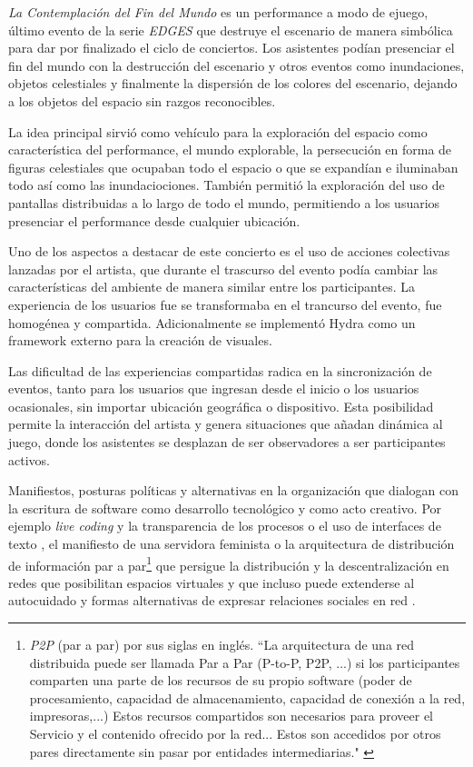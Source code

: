 \textit{La Contemplación del Fin del Mundo} es un performance a modo de ejuego, último evento de la serie \textit{EDGES} que destruye el escenario de manera simbólica para dar por finalizado el ciclo de conciertos. Los asistentes podían presenciar el fin del mundo con la destrucción del escenario y otros eventos como inundaciones, objetos celestiales y finalmente la dispersión de los colores del escenario, dejando a los objetos del espacio sin razgos reconocibles.

La idea principal sirvió como vehículo para la exploración del espacio como característica del performance, el mundo explorable, la persecución en forma de figuras celestiales que ocupaban todo el espacio o que se expandían e iluminaban todo así como las inundaciociones. También permitió la exploración del uso de pantallas distribuidas a lo largo de todo el mundo, permitiendo a los usuarios presenciar el performance desde cualquier ubicación.

Uno de los aspectos a destacar de este concierto es el uso de acciones colectivas lanzadas por el artista, que durante el trascurso del evento podía cambiar las características del ambiente de manera similar entre los participantes. La experiencia de los usuarios fue se transformaba en el trancurso del evento, fue homogénea y compartida. Adicionalmente se implementó Hydra \citep{hydra} como un framework externo para la creación de visuales.

Las dificultad de las experiencias compartidas radica en la sincronización de eventos, tanto para los usuarios que ingresan desde el inicio o los usuarios ocasionales, sin importar ubicación geográfica o dispositivo. Esta posibilidad permite la interacción del artista y genera situaciones que añadan dinámica al juego, donde los asistentes se desplazan de ser observadores a ser participantes activos.


\color{Fuchsia}

Manifiestos, posturas políticas y alternativas en la organización que dialogan con la escritura de software como desarrollo tecnológico y como acto creativo. Por ejemplo \textit{live coding} y la transparencia de los procesos o el uso de interfaces de texto \citep{collinsLivecoding}, el manifiesto de una servidora feminista \citep{feministserver} o la arquitectura de distribución de información par a par\footnote{\textit{P2P} (par a par) por sus siglas en inglés.  ``La arquitectura de una red distribuida puede ser llamada Par a Par (P-to-P, P2P, ...)   si los participantes comparten una parte de los recursos de su propio software (poder de procesamiento, capacidad de almacenamiento, capacidad de conexión a la red, impresoras,...) Estos recursos compartidos son necesarios para proveer el Servicio y el contenido ofrecido por la red... Estos son accedidos por otros pares directamente sin pasar por entidades intermediarias." \citep{p2p}} que persigue la distribución y la descentralización en redes que posibilitan espacios virtuales \citep{cyberspace} y que incluso puede extenderse al autocuidado y formas alternativas de expresar relaciones sociales en red \citep{dwc}. 

\color{black}

